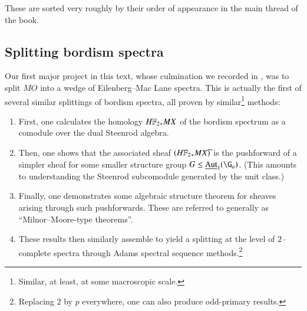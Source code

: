 These are sorted very roughly by their order of appearance in the main thread of the book.








\subsection*{Splitting bordism spectra}

Our first major project in this text, whose culmination we recorded in , was to split $MO$ into a wedge of Eilenberg--Mac Lane spectra.  This is actually the first of several similar splittings of bordism spectra, all proven by similar\footnote{Similar, at least, at some macroscopic scale.} methods:
\begin{enumerate}
    \item First, one calculates the homology $\HFtwo_* MX$ of the bordism spectrum as a comodule over the dual Steenrod algebra.
    \item Then, one shows that the associated sheaf $(\HFtwo_* MX)\widetilde{}$ is the pushforward of a simpler sheaf for some smaller structure group $G \le \InternalAut_1(\G_a)$.  (This amounts to understanding the Steenrod subcomodule generated by the unit class.)
    \item Finally, one demonstrates some algebraic structure theorem for sheaves arising through such pushforwards.  These are referred to generally as ``Milnor--Moore-type theorems''.
    \item These results then similarly assemble to yield a splitting at the level of $2$--complete spectra through Adams spectral sequence methods.\footnote{Replacing $2$ by $p$ everywhere, one can also produce odd-primary results.}
\end{enumerate}

